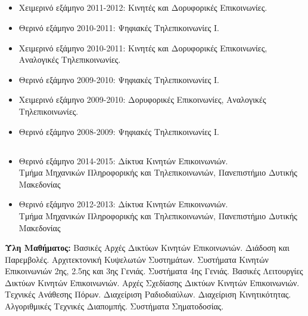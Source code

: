 \documentclass[11pt]{article}
\begin{document}
\subsection{}
\begin{itemize}\greektext

\item Χειμερινό εξάμηνο 2011-2012: Κινητές και Δορυφορικές Επικοινωνίες.

\item Θερινό εξάμηνο 2010-2011: Ψηφιακές Τηλεπικοινωνίες I.

\item Χειμερινό εξάμηνο 2010-2011: Κινητές και Δορυφορικές Επικοινωνίες, Αναλογικές Τηλεπικοινωνίες.

\item Θερινό εξάμηνο 2009-2010: Ψηφιακές Τηλεπικοινωνίες I.

\item Χειμερινό εξάμηνο 2009-2010: Δορυφορικές Επικοινωνίες, Αναλογικές Τηλεπικοινωνίες.

\item Θερινό εξάμηνο 2008-2009: Ψηφιακές Τηλεπικοινωνίες I. \end{itemize}

\subsection{}
\begin{itemize}
\item \greektext Θερινό εξάμηνο 2014-2015: Δίκτυα Κινητών Επικοινωνιών.\\ Τμήμα Μηχανικών Πληροφορικής και Τηλεπικοινωνιών, Πανεπιστήμιο Δυτικής Μακεδονίας
\item \greektext Θερινό εξάμηνο 2012-2013: Δίκτυα Κινητών Επικοινωνιών. \\ Τμήμα Μηχανικών Πληροφορικής και Τηλεπικοινωνιών, Πανεπιστήμιο Δυτικής Μακεδονίας
    \end{itemize}

\justify \textbf{Ύλη Μαθήματος:} Βασικές Αρχές Δικτύων Κινητών Επικοινωνιών. Διάδοση και Παρεμβολές. Αρχιτεκτονική Κυψελωτών Συστημάτων. Συστήματα Κινητών Επικοινωνιών 2ης, 2.5ης και 3ης Γενιάς. Συστήματα 4ης Γενιάς. Βασικές Λειτουργίες Δικτύων Κινητών Επικοινωνιών. Αρχές Σχεδίασης Δικτύων Κινητών Επικοινωνιών. Τεχνικές Ανάθεσης Πόρων. Διαχείριση Ραδιοδιαύλων. Διαχείριση Κινητικότητας. Αλγοριθμικές Τεχνικές Διαπομπής. Συστήματα Σηματοδοσίας.
\end{document}
